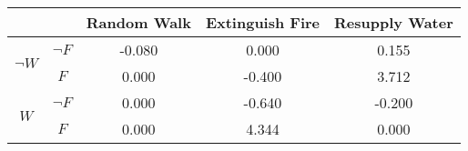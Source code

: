 \begin{center}
\begin{tabular}{|c|c|c|c|c|}
  \hline
  &   & Random Walk & Extinguish Fire & Resupply Water\\
  \hline
  \multirow{2}{*}{$\neg W$} & $\neg F$ & -0.080 & 0.000 & 0.155\\
  \cline{2-5}
   & $F$ & 0.000 & -0.400 & 3.712\\
  \hline
  \multirow{2}{*}{$W$} & $\neg F$ & 0.000 & -0.640 & -0.200\\
  \cline{2-5}
   & $F$ & 0.000 & 4.344 & 0.000\\
  \hline
\end{tabular}
\end{center}
